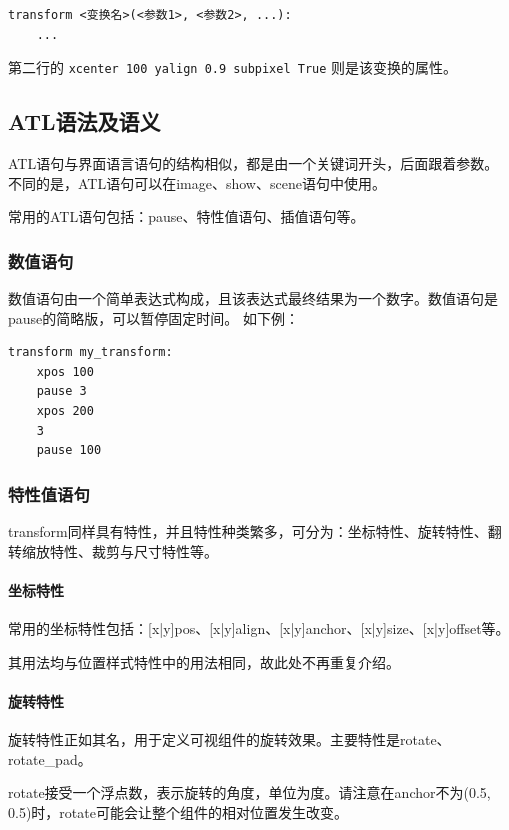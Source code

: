\documentclass[../../Main.tex]{subfiles}
\begin{document}
\begin{lstlisting}
transform <变换名>(<参数1>, <参数2>, ...):
    ...
\end{lstlisting}

第二行的 \verb|xcenter 100 yalign 0.9 subpixel True| 则是该变换的属性。

\subsection{ATL语法及语义}
ATL语句与界面语言语句的结构相似，都是由一个关键词开头，后面跟着参数。不同的是，ATL语句可以在image、show、scene语句中使用。

常用的ATL语句包括：pause、特性值语句、插值语句等。

\subsubsection{数值语句}

数值语句由一个简单表达式构成，且该表达式最终结果为一个数字。数值语句是pause的简略版，可以暂停固定时间。
如下例：

\begin{lstlisting}
transform my_transform:
    xpos 100
    pause 3
    xpos 200
    3
    pause 100
\end{lstlisting}

\subsubsection{特性值语句}

transform同样具有特性，并且特性种类繁多，可分为：坐标特性、旋转特性、翻转缩放特性、裁剪与尺寸特性等。

\paragraph{坐标特性}
常用的坐标特性包括：[x|y]pos、[x|y]align、[x|y]anchor、[x|y]size、[x|y]offset等。

其用法均与位置样式特性中的用法相同，故此处不再重复介绍。

\paragraph{旋转特性}
旋转特性正如其名，用于定义可视组件的旋转效果。主要特性是rotate、rotate\_pad。

rotate接受一个浮点数，表示旋转的角度，单位为度。请注意在anchor不为(0.5, 0.5)时，rotate可能会让整个组件的相对位置发生改变。
\end{document}
